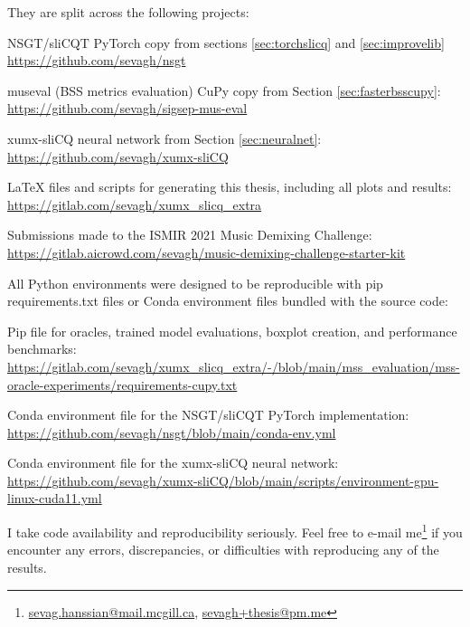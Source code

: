 \documentclass[report.tex]{subfiles}
\begin{document}
\begin{appendices}
They are split across the following projects:
\begin{tight_enumerate}
	\item
		NSGT/sliCQT PyTorch copy from sections \ref{sec:torchslicq} and \ref{sec:improvelib}\\
		\url{https://github.com/sevagh/nsgt}
	\item
		museval (BSS metrics evaluation) CuPy copy from Section \ref{sec:fasterbsscupy}:\\
		\url{https://github.com/sevagh/sigsep-mus-eval}
	\item
		xumx-sliCQ neural network from Section \ref{sec:neuralnet}:\\
		\url{https://github.com/sevagh/xumx-sliCQ}
	\item
		LaTeX files and scripts for generating this thesis, including all plots and results:\\
		\url{https://gitlab.com/sevagh/xumx_slicq_extra}
	\item
		Submissions made to the ISMIR 2021 Music Demixing Challenge:\\
		\url{https://gitlab.aicrowd.com/sevagh/music-demixing-challenge-starter-kit}
\end{tight_enumerate}

All Python environments were designed to be reproducible with pip requirements.txt files or Conda environment files bundled with the source code:

\begin{tight_enumerate}
	\item
		Pip file for oracles, trained model evaluations, boxplot creation, and performance benchmarks:\\
		\url{https://gitlab.com/sevagh/xumx_slicq_extra/-/blob/main/mss_evaluation/mss-oracle-experiments/requirements-cupy.txt}
	\item
		Conda environment file for the NSGT/sliCQT PyTorch implementation:\\
		\url{https://github.com/sevagh/nsgt/blob/main/conda-env.yml}
	\item
		Conda environment file for the xumx-sliCQ neural network:\\
		\href{https://github.com/sevagh/xumx-sliCQ/blob/main/scripts/environment-gpu-linux-cuda11.yml}{https://github.com/sevagh/xumx-sliCQ/blob/main/scripts/environment-gpu-linux-cuda11.yml}
\end{tight_enumerate}

I take code availability and reproducibility seriously. Feel free to e-mail me\footnote{\href{mailto:sevag.hanssian@mail.mcgill.ca}{sevag.hanssian@mail.mcgill.ca}, \href{mailto:sevagh+thesis@pm.me}{sevagh+thesis@pm.me}} if you encounter any errors, discrepancies, or difficulties with reproducing any of the results.

\end{appendices}
\end{document}
